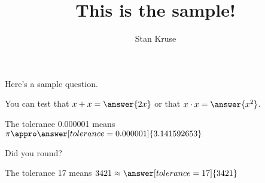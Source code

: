 \documentclass{ximera}
\title{This is the sample!}
\author{Stan Kruse}
\begin{document}
\maketitle

Here's a sample question.

\begin{problem}
\begin{multipleChoice}
\end{multipleChoice}
\end{problem}

\begin{problem}
   You can test that $x + x = \answer{2x}$ or that $x \cdot x = \answer{x^2}$.
    \begin{problem}
    The tolerance 0.000001 means $\pi \appro \answer[tolerance=0.000001]{3.141592653}$
        \begin{hint}
        Did you round?
        \end{hint}
    \end{problem}
\end{problem}



\begin{problem}
   The tolerance 17 means $3421 \approx \answer[tolerance=17]{3421}$
\end{problem}
\end{document}
